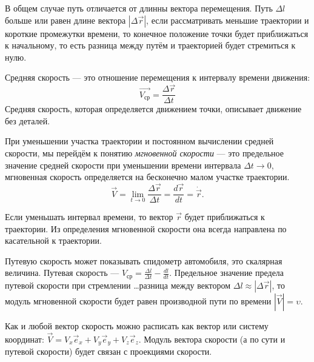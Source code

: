 В общем случае путь отличается от длинны вектора перемещения. Путь \( \Delta l
\) больше или равен длине вектора \( |\Delta \vec{r}| \), если рассматривать
меньшие траектории и короткие промежутки времени, то конечное положение точки
будет приближаться к начальному, то есть разница между путём и траекторией
будет стремиться к нулю.

Средняя скорость --- это отношение перемещения к интервалу времени движения:
\begin{equation}
	\vec{V_\text{ср}} = \frac{\Delta \vec{r}}{\Delta t}
\end{equation}
Средняя скорость, которая определяется движением точки, описывает движение без
деталей.

При уменьшении участка траектории и постоянном вычислении средней скорости, мы
перейдём к понятию \emph{мгновенной скорости} --- это предельное значение
средней скорости при уменьшении времени интервала \( \Delta t \to 0 \),
мгновенная скорость определяется на бесконечно малом участке траектории.
\[
	\vec{V} = \lim_{t \to 0} \frac{\Delta \vec{r}}{\Delta t} = \frac{d \vec{r}}{d
		t} = \dot{\vec{r}}
	.\]

\begin{figure}[!htbp]
	\begin{center}
	\end{center}
\end{figure}

Если уменьшать интервал времени, то вектор \( \vec{r} \) будет приближаться к
траектории. Из определения мгновенной скорости она всегда направлена по
касательной к траектории.

Путевую скорость может показывать спидометр
автомобиля, это скалярная величина. Путевая скорость --- \( V_\text{ср} =
\frac{\Delta l}{\Delta t} - \frac{d l}{d t} \). Предельное значение предела
путевой скорости при стремлении \ldots разница между вектором \( \Delta l
\approx |\Delta \vec{r}| \), то модуль мгновенной скорости будет равен
производной пути по времени \( |\vec{V}| = \upsilon \).

Как и любой вектор скорость можно расписать как вектор или систему координат:
\( \vec{V} = V_x \vec{e}_x + V_y \vec{e}_y + V_z \vec{e}_z \). Модуль вектора
скорости (а по сути и путевой скорости) будет связан с проекциями скорости.

